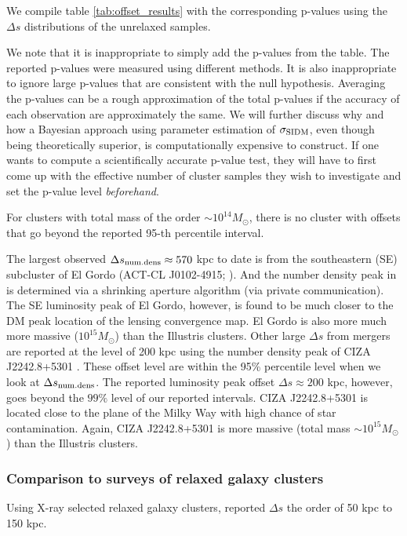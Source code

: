 We compile table \ref{tab:offset_results} with the corresponding p-values using
the $\Delta s$ distributions of the unrelaxed samples. 


We note that it is inappropriate to simply add the p-values from the table.
The reported p-values were measured using different methods.
It is also inappropriate to ignore large p-values that are consistent with the null hypothesis. 
Averaging the p-values can be a rough approximation of the total p-values 
if the accuracy of each observation are approximately the same.  
We will further discuss why and how a Bayesian approach using parameter 
estimation of $\sigma_{\rm SIDM}$, even though being theoretically superior, is
computationally expensive to construct. If one wants to compute a
scientifically accurate p-value test, they will have to first come up with the
effective number of cluster samples they wish to investigate and set the p-value level 
{\it beforehand}.  



For clusters with total mass of the order $\sim 10^{14} M_{\odot}$,
there is no cluster with offsets 
that go beyond the reported 95-th percentile interval.  



The largest observed $\Delta s_{\rm num. dens} \approx 570$ 
kpc to date is from the southeastern (SE) subcluster of El Gordo (ACT-CL J0102-4915; 
\citealt{Jee2014}). 
And the number density peak in \citep{Jee2014} is determined via a shrinking 
aperture algorithm (via private communication).
The SE luminosity peak of El Gordo, however, is found to be much closer 
to the DM peak location of the lensing convergence map.
El Gordo is also more much more massive ($10^{15} M_{\odot}$) than the Illustris
clusters.
Other large $\Delta s$ from mergers are reported at the level of 200 kpc 
using the number density peak of CIZA J2242.8+5301 \citep{Jee2015}
. These offset level are within the 95\% percentile level 
when we look at $\Delta s_{\rm num. dens}$. The reported 
luminosity peak offset $\Delta
s \approx 200$ kpc, however, goes beyond the $99\%$ level of our reported
intervals. CIZA J2242.8+5301 is located close to the plane
of the Milky Way with high chance of star contamination. 
Again, CIZA J2242.8+5301 is more massive (total mass $\sim 10^{15} M_{\odot}$) 
than the Illustris clusters.

\subsubsection{Comparison to surveys of relaxed galaxy clusters}
Using X-ray selected relaxed galaxy clusters, 
\citep{George2012a} reported $\Delta s$ the order of 50 kpc to 150 kpc. 

